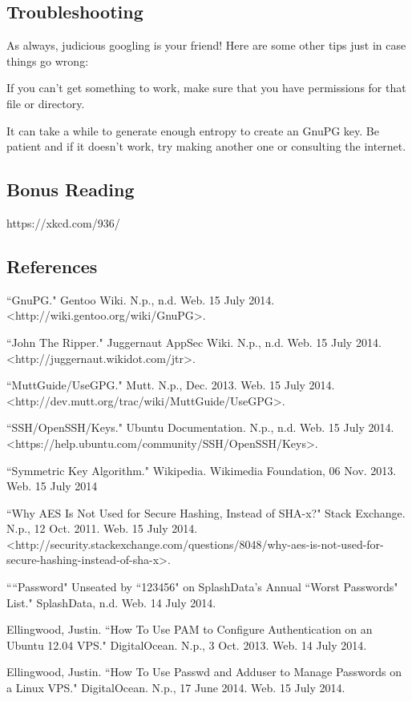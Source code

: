 \documentclass[11pt,a4paper]{article}
\begin{document}
\subsection*{Troubleshooting}

\indent\indent As always, judicious googling is your friend! Here are some other tips just in case things go wrong: 

If you can't get something to work, make sure that you have permissions for that file or directory. 

It can take a while to generate enough entropy to create an GnuPG key. Be patient and if it doesn't work, try making another one or consulting the internet.  

\subsection*{Bonus Reading}
https://xkcd.com/936/

\subsection*{References}

\indent\indent ``GnuPG." Gentoo Wiki. N.p., n.d. Web. 15 July 2014. <http://wiki.gentoo.org/wiki/GnuPG>.

``John The Ripper." Juggernaut AppSec Wiki. N.p., n.d. Web. 15 July 2014. 
<http://juggernaut.wikidot.com/jtr>.

``MuttGuide/UseGPG." Mutt. N.p., Dec. 2013. Web. 15 July 2014. <http://dev.mutt.org/trac/wiki/MuttGuide/UseGPG>.

``SSH/OpenSSH/Keys." Ubuntu Documentation. N.p., n.d. Web. 15 July 2014. <https://help.ubuntu.com/community/SSH/OpenSSH/Keys>.

``Symmetric Key Algorithm." Wikipedia. Wikimedia Foundation, 06 Nov. 2013. Web. 15 July 2014 

``Why AES Is Not Used for Secure Hashing, Instead of SHA-x?" Stack Exchange. N.p., 12 Oct. 2011. Web. 15 July 2014.
<http://security.stackexchange.com/questions/8048/why-aes-is-not-used-for-secure-hashing-instead-of-sha-x>.


````Password" Unseated by ``123456" on SplashData’s Annual ``Worst Passwords" List." SplashData, n.d. Web. 14 July 2014.


Ellingwood, Justin. ``How To Use PAM to Configure Authentication on an Ubuntu 12.04 VPS." DigitalOcean. N.p., 3 Oct. 2013. Web. 14 July 2014.

Ellingwood, Justin. ``How To Use Passwd and Adduser to Manage Passwords on a Linux VPS." DigitalOcean. N.p., 17 June 2014. Web. 15 July 2014. 
\end{document}
